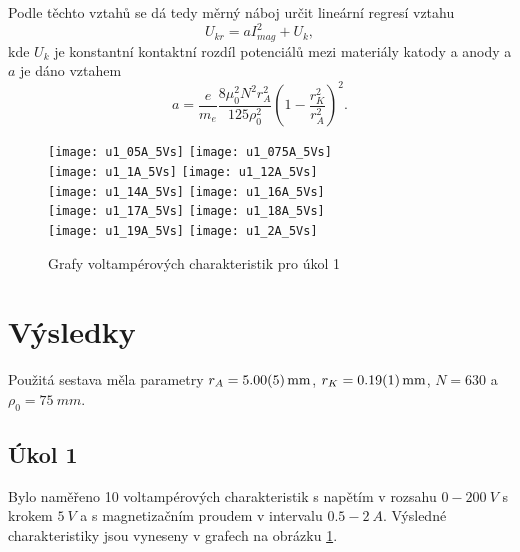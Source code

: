\documentclass{protokol}
\begin{document}
    Podle těchto vztahů se dá tedy měrný náboj určit lineární regresí vztahu 
    \begin{equation} \label{eq:fit}
      U_{kr} = a I_{mag}^2 + U_k,
    \end{equation}
    kde $U_k$ je konstantní kontaktní rozdíl potenciálů mezi materiály katody a anody a $a$ je dáno vztahem 
    \begin{equation} \label{eq:a}
      a = \frac{ e }{ m_e } \frac{ 8 \mu_0^2 N^2 r_A^2 }{ 125 \rho_0^2 }
        \left( 1 - \frac{ r_K^2 }{ r_A^2 } \right)^2.
    \end{equation}
    
    \begin{figure}[H]
      \centering
      \texttt{[image: u1\_05A\_5Vs]}
      \texttt{[image: u1\_075A\_5Vs]}\\ \vspace{-15px}
      \texttt{[image: u1\_1A\_5Vs]}
      \texttt{[image: u1\_12A\_5Vs]}\\ \vspace{-15px}
      \texttt{[image: u1\_14A\_5Vs]}
      \texttt{[image: u1\_16A\_5Vs]}\\ \vspace{-15px}
      \texttt{[image: u1\_17A\_5Vs]}
      \texttt{[image: u1\_18A\_5Vs]}\\ \vspace{-15px}
      \texttt{[image: u1\_19A\_5Vs]}
      \texttt{[image: u1\_2A\_5Vs]} \vspace{-15px}
      \caption{Grafy voltampérových charakteristik pro úkol 1}
      \label{fig:u1}
    \end{figure} 

  \section*{Výsledky} 

    Použitá sestava měla parametry $r_A = \SI{5.00 \pm 0.05}{mm}$, $r_K = \SI{0.19 \pm 0.01}{mm}$, $N = 630$ a $\rho_0 = \SI{75}{mm}$.

    \subsection*{Úkol 1}

      Bylo naměřeno 10 voltampérových charakteristik s napětím v rozsahu $0 -   \SI{200}{V}$ s krokem $\SI{5}{V}$ a s magnetizačním proudem v intervalu $ \num{0.5} - \SI{2}{A} $. Výsledné charakteristiky jsou  vyneseny v grafech na obrázku \ref{fig:u1}. 
\end{document}
